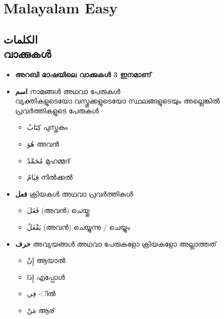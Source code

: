\part{Malayalam Easy}

\chapter{\textarabic{الكلمات} \\ \textmalayalam{വാക്കുകൾ}}

\begin{itemize}	    \setlength{\itemsep}{5pt}
\item \textbf{അറബി ഭാഷയിലെ വാക്കുകൾ 3 ഇനമാണ് }
	
\item \textbf{\textarabic{اسم}} നാമങ്ങൾ അഥവാ പേരുകൾ \\

വ്യക്തികളുടെയോ വസ്തുക്കളുടെയോ സ്ഥലങ്ങളുടെയും അല്ലെങ്കിൽ പ്രവർത്തികളുടെ പേരുകൾ 
	
	\begin{itemize}	    \setlength{\itemsep}{5pt}
		\item \textarabic{كِتَابٌ} \qquad പുസ്തകം
		\item \textarabic{هُوَ} \qquad അവൻ
		\item \textarabic{مُحَمَّدٌ} \qquad മുഹമ്മദ്
		\item \textarabic{قِيَامٌ} \qquad നിൽക്കൽ
	\end{itemize}

\item 	\textbf{\textarabic{فعل}} ക്രിയകൾ അഥവാ പ്രവർത്തികൾ 
	\begin{itemize}	    \setlength{\itemsep}{5pt}
	\item \textarabic{فَعَلَ} \qquad (അവൻ) ചെയ്തു 
	\item \textarabic{يَفْعَلُ} \qquad (അവൻ) ചെയ്യുന്നു / ചെയ്യും

\end{itemize}
	
\item 	\textbf{\textarabic{حرف}} അവ്യയങ്ങൾ അഥവാ 	പേരുകളോ  ക്രിയകളോ അല്ലാത്തത്
		\begin{itemize}	    \setlength{\itemsep}{5pt}
		\item \textarabic{إِنْ} \qquad ആയാൽ
		\item \textarabic{إِذَا} \qquad എപ്പോൾ
		\item \textarabic{فِي} \qquad -ിൽ
		\item \textarabic{مَنْ} \qquad ആര്
	\end{itemize}
\end{itemize}


	
